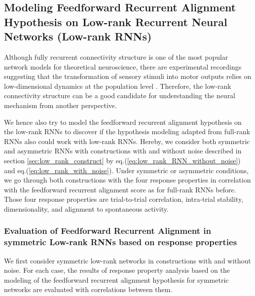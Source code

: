 \documentclass[11pt]{article}
\begin{document}
	\clearpage
	\subsection{Modeling Feedforward Recurrent Alignment Hypothesis on Low-rank Recurrent Neural Networks (Low-rank RNNs)} \label{sec:low_rank_result}
	Although fully recurrent connectivity structure is one of the most popular network models for theoretical neuroscience, there are experimental recordings suggesting that the transformation of sensory stimuli into motor outputs relies on low-dimensional dynamics at the population level \cite{mastrogiuseppe2018linking}. Therefore, the low-rank connectivity structure can be a good candidate for understanding the neural mechanism from another perspective. 
	
	We hence also try to model the feedforward recurrent alignment hypothesis on the low-rank RNNs to discover if the hypothesis modeling adapted from full-rank RNNs also could work with low-rank RNNs. 
	Hereby, we consider both symmetric and asymmetric RNNs with constructions with and without noise described in section \ref{sec:low_rank_construct} by eq.(\ref{eq:low_rank_RNN_without_noise}) and eq.(\ref{eq:low_rank_with_noise}). Under symmetric or asymmetric conditions, we go through both constructions with the four response properties in correlation with the feedforward recurrent alignment score as for full-rank RNNs before. Those four response properties are trial-to-trial correlation, intra-trial stability, dimensionality, and alignment to spontaneous activity. %
	
	\subsubsection{Evaluation of Feedforward Recurrent Alignment in symmetric Low-rank RNNs based on response properties}
	We first consider symmetric low-rank networks in constructions with and without noise. For each case, the results of response property analysis based on the modeling of the feedforward recurrent alignment hypothesis for symmetric networks are evaluated with correlations between them. 
	
\end{document}
